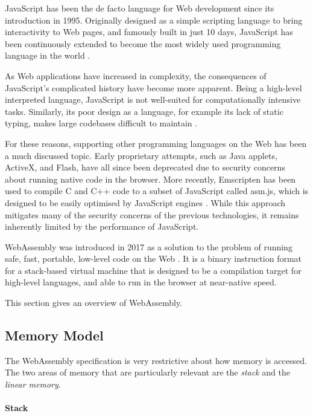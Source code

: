 JavaScript has been the de facto language for Web development since its introduction in 1995. Originally designed as a simple scripting language to bring interactivity to Web pages, and famously built in just 10 days, JavaScript has been continuously extended to become the most widely used programming language in the world \cite{wirfs-brockJavaScriptfirst202020a}.

As Web applications have increased in complexity, the consequences of JavaScript's complicated history have become more apparent. Being a high-level interpreted language, JavaScript is not well-suited for computationally intensive tasks. Similarly, its poor design as a language, for example its lack of static typing, makes large codebases difficult to maintain \cite{ocarizajr.JavaScriptErrorsWild2011, biermanUnderstandingTypeScript2014}.

For these reasons, supporting other programming languages on the Web has been a much discussed topic. Early proprietary attempts, such as Java applets, ActiveX, and Flash, have all since been deprecated due to security concerns about running native code in the browser. More recently, Emscripten has been used to compile C and C++ code to a subset of JavaScript called asm.js, which is designed to be easily optimised by JavaScript engines \cite{zakaiEmscriptenLLVMtoJavaScriptcompiler2011}. While this approach mitigates many of the security concerns of the previous technologies, it remains inherently limited by the performance of JavaScript.

WebAssembly was introduced in 2017 as a solution to the problem of running safe, fast, portable, low-level code on the Web \cite{haasBringingwebspeed2017}. It is a binary instruction format for a stack-based virtual machine that is designed to be a compilation target for high-level languages, and able to run in the browser at near-native speed.

This section gives an overview of WebAssembly.

\subsection{Memory Model}

The WebAssembly specification \cite{webassemblycommunitygroupWebAssemblySpecification202025} is very restrictive about how memory is accessed. The two areas of memory that are particularly relevant are the \emph{stack} and the \emph{linear memory}.

\paragraph{Stack}

